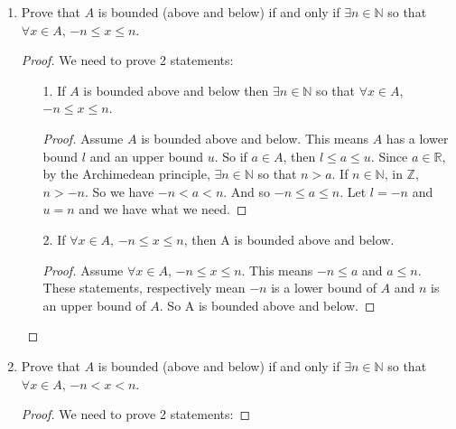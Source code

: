 \documentclass{article}
\theoremstyle{claim}
\theoremstyle{definition}
\begin{document}
\begin{enumerate}
\begin{enumerate}
\begin{proof}
                Assume $A$ is a set of real numbers. Assume $A$ has a lower bound $l$ and an upper bound $u$. So if $a \in A$, then $l \le a \le u$. Since $a \in \mathbb{R}$, by the Archimedean principle, $\exists n \in \mathbb{N}$ so that $n > a$. If $n \in \mathbb{N}$, in $\mathbb{Z}$, $n > -n$. So we have $-n < a < n$. And so $-n \le a \le n$. Let $l = -n$ and $u = n$ and we have what we need.
            \end{proof}
            \item Prove that $A$ is bounded (above and below) if and only if $\exists n \in \mathbb{N}$ so that $\forall x \in A$, $-n \le x \le n$.
            \begin{proof}
                We need to prove 2 statements: 
                \begin{enumerate}
                    \item[1.] If $A$ is bounded above and below then $\exists n \in \mathbb{N}$ so that $\forall x \in A$, $-n \le x \le n$.\\
                    \begin{proof}
                        Assume $A$ is bounded above and below. This means $A$ has a lower bound $l$ and an upper bound $u$. So if $a \in A$, then $l \le a \le u$. Since $a \in \mathbb{R}$, by the Archimedean principle, $\exists n \in \mathbb{N}$ so that $n > a$. If $n \in \mathbb{N}$, in $\mathbb{Z}$, $n > -n$. So we have $-n < a < n$. And so $-n \le a \le n$. Let $l = -n$ and $u = n$ and we have what we need.
                    \end{proof}
                    \item[2.] If $\forall x \in A$, $-n \le x \le n$, then A is bounded above and below.\\
                    \begin{proof}
                        Assume $\forall x \in A$, $-n \le x \le n$. This means $-n \le a$ and $a \le n$. These statements, respectively mean $-n$ is a lower bound of $A$ and $n$ is an upper bound of $A$. So A is bounded above and below.
                    \end{proof}
                \end{enumerate}
            \end{proof}
            \item Prove that $A$ is bounded (above and below) if and only if $\exists n \in \mathbb{N}$ so that $\forall x \in A$, $-n < x < n$.
            \begin{proof}
                We need to prove 2 statements: 

\end{proof}
\end{enumerate}
\end{enumerate}
\end{document}
